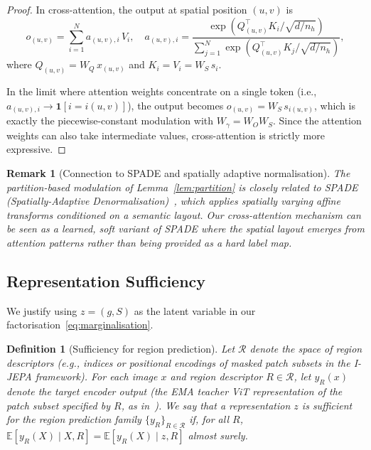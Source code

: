 \documentclass[12pt]{article}
\newtheorem{remark}{Remark}
\newtheorem{definition}[theorem]{Definition}
\begin{document}
\begin{proof}
In cross-attention, the output at spatial position $(u,v)$ is
\begin{equation}\label{eq:xattn-output}
    o_{(u,v)} = \sum_{i=1}^{N} a_{(u,v),i}\, V_i,
    \quad
    a_{(u,v),i} = \frac{\exp(Q_{(u,v)}^\top K_i / \sqrt{d/n_h})}
    {\sum_{j=1}^{N} \exp(Q_{(u,v)}^\top K_j / \sqrt{d/n_h})},
\end{equation}
where $Q_{(u,v)} = W_Q\, x_{(u,v)}$ and $K_i = V_i = W_S\, s_i$.

In the limit where attention weights concentrate on a single token
(i.e., $a_{(u,v),i} \to \mathbf{1}[i = i(u,v)]$), the output becomes
$o_{(u,v)} = W_S\, s_{i(u,v)}$, which is exactly the piecewise-constant
modulation with $W_\gamma = W_O W_S$.
Since the attention weights can also take intermediate values,
cross-attention is strictly more expressive.
\end{proof}

\begin{remark}[Connection to SPADE and spatially adaptive normalisation]
\label{rem:spade}
The partition-based modulation of Lemma~\ref{lem:partition} is
closely related to SPADE (Spatially-Adaptive Denormalisation)~\cite{park2019spade},
which applies spatially varying affine transforms conditioned on a
semantic layout.
Our cross-attention mechanism can be seen as a \emph{learned, soft}
variant of SPADE where the spatial layout emerges from attention
patterns rather than being provided as a hard label map.
\end{remark}

\subsection{Representation Sufficiency}
\label{sec:sufficiency}

We justify using $z = (g, S)$ as the latent variable in our
factorisation~\eqref{eq:marginalisation}.

\begin{definition}[Sufficiency for region prediction]
\label{def:sufficiency}
Let $\mathcal{R}$ denote the space of region descriptors (e.g., indices
or positional encodings of masked patch subsets in the I-JEPA framework).
For each image $x$ and region descriptor $R \in \mathcal{R}$,
let $y_R(x)$ denote the \emph{target encoder} output
(the EMA teacher ViT representation of the patch subset specified by $R$,
as in~\cite{assran2023ijepa}).
We say that a representation $z$ is \emph{sufficient for the region
prediction family} $\{y_R\}_{R \in \mathcal{R}}$ if, for all $R$,
$\mathbb{E}[y_R(X) \mid X, R] = \mathbb{E}[y_R(X) \mid z, R]$
almost surely.
\end{definition}
\end{document}
